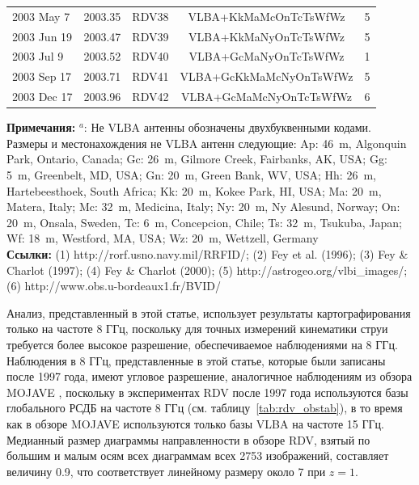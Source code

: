 \begin{table}
\begin{SingleSpace}
\begin{tabular}{lcccc}
2003 May 7  & 2003.35 & RDV38  & VLBA+KkMaMcOnTcTsWfWz     & 5   \\
2003 Jun 19 & 2003.47 & RDV39  & VLBA+KkMaNyOnTcTsWfWz     & 5   \\
2003 Jul 9  & 2003.52 & RDV40  & VLBA+GcMaNyOnTcTsWfWz     & 1   \\
2003 Sep 17 & 2003.71 & RDV41  & VLBA+GcKkMaMcNyOnTsWfWz   & 5   \\
2003 Dec 17 & 2003.96 & RDV42  & VLBA+GcMaMcNyOnTcTsWfWz   & 6   \\
\bottomrule
\end{tabular}
\end{SingleSpace}
\textbf{Примечания:}
$^a$: Не VLBA антенны обозначены двухбуквенными кодами.
Размеры и местонахождения не VLBA антенн следующие:
Ap: 46~m, Algonquin Park, Ontario, Canada;
Gc: 26~m, Gilmore Creek, Fairbanks, AK, USA;
Gg: 5~m, Greenbelt, MD, USA;
Gn: 20~m, Green Bank, WV, USA;
Hh: 26~m, Hartebeesthoek, South Africa;
Kk: 20~m, Kokee Park, HI, USA;
Ma: 20~m, Matera, Italy;
Mc: 32~m, Medicina, Italy;
Ny: 20~m, Ny Alesund, Norway;
On: 20~m, Onsala, Sweden,
Tc: 6~m, Concepcion, Chile;
Ts: 32~m, Tsukuba, Japan;
Wf: 18~m, Westford, MA, USA;
Wz: 20~m, Wettzell, Germany\\
\textbf{Ссылки:}
(1) http://rorf.usno.navy.mil/RRFID/;
(2) Fey et al. (1996);
(3) Fey \& Charlot (1997);
(4) Fey \& Charlot (2000);
(5) http://astrogeo.org/vlbi\_images/;
(6) http://www.obs.u-bordeaux1.fr/BVID/ \\
\end{table}

Анализ, представленный в этой статье, использует результаты картографирования только на частоте 8
ГГц, поскольку для точных измерений кинематики струи требуется более высокое разрешение,
обеспечиваемое наблюдениями на 8 ГГц. Наблюдения в 8 ГГц, представленные в этой статье, которые были
записаны после 1997 года, имеют угловое разрешение, аналогичное наблюдениям из обзора MOJAVE
\cite{Lister_2009a}, поскольку в экспериментах RDV после 1997 года используются базы глобального
РСДБ на частоте 8 ГГц (см. таблицу~\ref{tab:rdv_obstab}), в то время как в обзоре MOJAVE
используются только базы VLBA на частоте 15 ГГц. Медианный размер диаграммы направленности в обзоре
RDV, взятый по большим и малым осям всех диаграммам всех 2753 изображений, составляет величину
\SI{0.9}{\mas}, что соответствует линейному размеру около \SI{7}{\parsec} при $z = 1$.

